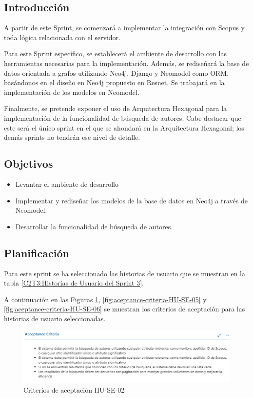 \subsection{Introducción}
\label{section:introduction-sprint-3}
A partir de este Sprint, se comenzará a implementar la integración con Scopus y toda lógica relacionada con el servidor. 

Para este Sprint específico, se establecerá el ambiente de desarrollo con las herramientas necesarias para la implementación.
Además, se rediseñará la base de datos orientada a grafos utilizando Neo4j, Django y Neomodel como ORM, basándonos en el diseño en Neo4j propuesto en Resnet.
Se trabajará en la implementación de los modelos en Neomodel.

Finalmente, se pretende exponer el uso de Arquitectura Hexagonal para la implementación de la funcionalidad de búsqueda de autores. Cabe destacar que este será el único sprint en el que se ahondará en la Arquitectura Hexagonal;
los demás sprints no tendrán ese nivel de detalle.

\subsection{Objetivos}

\begin{itemize}
    \item Levantar el ambiente de desarrollo
    \item Implementar y rediseñar los modelos de la base de datos en Neo4j a través de Neomodel.
    \item Desarrollar la funcionalidad de búsqueda de autores.
\end{itemize}

\subsection{Planificación}

Para este sprint se ha seleccionado las historias de usuario que se muestran en la tabla \ref{C2T3:Historias de Usuario del Sprint 3}.



A continuación en las Figuras \ref{fig:aceptance-criteria-HU-SE-02}, \ref{fig:aceptance-criteria-HU-SE-05} y \ref{fig:aceptance-criteria-HU-SE-06}
se muestran los criterios de aceptación para las historias de usuario seleccionadas.
\begin{figure}[H]
    \centering
    \includegraphics[scale=0.7]{../02Figures/02Chapter/Sprints/Sprint-3/aceptance-criteria-HU-SE-02.png}
    \caption{Criterios de aceptación HU-SE-02}
    \label{fig:aceptance-criteria-HU-SE-02}
\end{figure}

